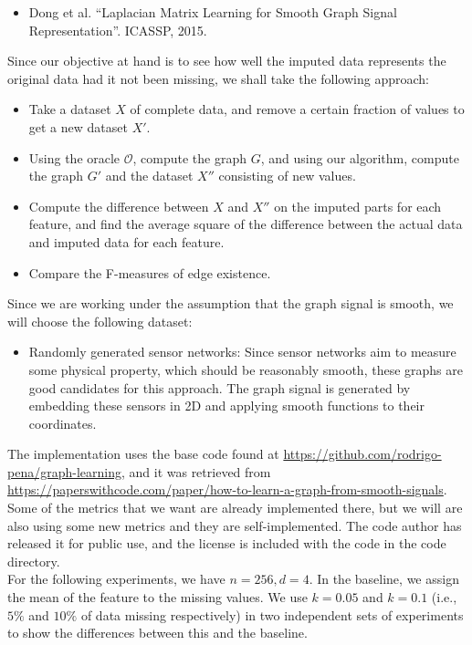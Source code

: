 \documentclass[a4paper]{article}
\newcommand{\nl}{\vspace{0.2cm}\\}
\newcommand{\mc}{\mathcal}
\begin{document}
\begin{itemize}
    \item Dong et al. ``Laplacian Matrix Learning for Smooth Graph Signal Representation''. ICASSP, 2015.
\end{itemize}

Since our objective at hand is to see how well the imputed data represents the original data had it not been missing, we shall take the following approach:
\begin{itemize}
    \item Take a dataset $X$ of complete data, and remove a certain fraction of values to get a new dataset $X'$.
    \item Using the oracle $\mc{O}$, compute the graph $G$, and using our algorithm, compute the graph $G'$ and the dataset $X''$ consisting of new values.
    \item Compute the difference between $X$ and $X''$ on the imputed parts for each feature, and find the average square of the difference between the actual data and imputed data for each
        feature.
    \item Compare the F-measures of edge existence.
\end{itemize}

Since we are working under the assumption that the graph signal is smooth, we will choose the following dataset:

\begin{itemize}
    \item Randomly generated sensor networks: Since sensor networks aim to measure some physical property, which should be reasonably smooth, these graphs are good candidates for this approach.
        The graph signal is generated by embedding these sensors in 2D and applying smooth functions to their coordinates.
\end{itemize}

The implementation uses the base code found at \href{https://github.com/rodrigo-pena/graph-learning}{https://github.com/rodrigo-pena/graph-learning}, and it was retrieved from
\href{https://paperswithcode.com/paper/how-to-learn-a-graph-from-smooth-signals}{https://paperswithcode.com/paper/how-to-learn-a-graph-from-smooth-signals}. Some of the metrics that we
want are already implemented there, but we will are also using some new metrics and they are self-implemented. The code author has released it for public use, and the license is included with the code in the code
directory.\nl

For the following experiments, we have $n = 256, d = 4$. In the baseline, we assign the mean of the feature to the missing values. We use $k = 0.05$ and $k = 0.1$ (i.e., $5\%$ and $10\%$ of data
missing respectively) in two independent sets of experiments to show the differences between this and the baseline.
\end{document}
